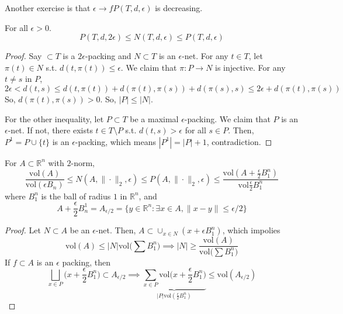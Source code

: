 Another exercise is that $\epsilon \to fP(T, d, \epsilon)$ is decreasing. 

\begin{theorem}
  \label{thm:covering-packing-duality}
  For all $\epsilon > 0$. 
	\begin{equation}
	  P(T, d, 2 \epsilon) \leq N(T, d, \epsilon) \leq P(T, d, \epsilon)
	\end{equation}
\end{theorem}
\begin{proof}
  Say $ \subset T$ is a $2\epsilon$-packing and $N \subset T$ is an $\epsilon$-net. For any $t \in T$, let $\pi(t) \in N$ s.t. $d(t, \pi(t)) \leq \epsilon$. We claim that $\pi: P \to N$ is injective. For any $t \neq s$ in $P$, 
	\begin{equation}
		2 \epsilon < d(t, s) \leq d(t, \pi(t)) + d(\pi(t), \pi(s)) + d(\pi(s), s) \leq 2 \epsilon + d(\pi(t), \pi(s))
	\end{equation}
	So, $d(\pi(t), \pi(s)) > 0$. So, $|P| \leq |N|$. 

	For the other inequality, let $P \subset T$ be a maximal $\epsilon$-packing. We claim that $P$ is an $\epsilon$-net. If not, there exists $t \in T \setminus P$ s.t. $d(t, s) > \epsilon$ for all $s \in P$. Then, $P^1 = P \cup \{t\}$ is an $\epsilon$-packing, which means $|P^1| = |P| + 1$, contradiction. 
\end{proof}

\begin{theorem}
  \label{thm:volumetric-bound}
	For $A \subset \mathbb{R}^n$ with $2$-norm, 
	\begin{equation}
		\frac{\mathrm{vol}(A)}{\mathrm{vol}(\epsilon B_n)} \leq N(A, \|\cdot \|_2, \epsilon) \leq P(A, \|\cdot\|_2, \epsilon) \leq \frac{\mathrm{vol}(A + \frac{\epsilon}{2} B^n_1)}{\mathrm{vol} \frac{\epsilon}{2} B_1^n}
	\end{equation}
	where $B_1^n$ is the ball of radius $1$ in $\mathbb{R}^n$, and 
	\begin{equation}
		A + \frac{\epsilon}{2} B_n^1 = A_{\epsilon/2} = \{ y \in \mathbb{R}^n \colon \exists x \in A, \|x - y\| \leq \epsilon/2 \}
	\end{equation}
\end{theorem}
\begin{proof}
	Let $N \subset A$ be an $\epsilon$-net. Then, $A \subset \cup_{x \in N} (x + \epsilon B_1^n)$, which impolies 
	\begin{equation}
		\mathrm{vol}(A) \leq |N| \mathrm{vol} \big( \sum B_1^n \big) \implies |N| \geq \frac{\mathrm{vol}(A)}{\mathrm{vol} \big( \sum B_1^n \big)}
	\end{equation}
	If $f \subset A$ is an $\epsilon$ packing, then
	\begin{equation}
		\bigsqcup_{x \in P} \big( x + \frac{\epsilon}{2} B_1^n \big) \subset A_{\epsilon/2} \implies \underbrace{\sum_{x \in P} \mathrm{vol} \big( x + \frac{\epsilon}{2} B_1^n \big)}_{|P| \mathrm{vol}( \frac{\epsilon}{2} B_1^n)} \leq \mathrm{vol}(A_{\epsilon/2})
	\end{equation}
\end{proof}

